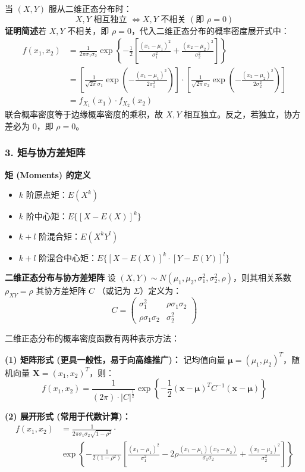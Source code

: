 当 $(X, Y)$ 服从二维正态分布时：
$$ X, Y \text{ 相互独立 } \iff X, Y \text{ 不相关 } (\text{即 } \rho = 0) $$
\textbf{证明简述}\quad 若 $X, Y$ 不相关，即 $\rho = 0$，代入二维正态分布的概率密度展开式中：
$$ 
\begin{aligned}
f(x_1, x_2) &= \frac{1}{2\pi \sigma_1 \sigma_2} \exp\left\{ -\frac{1}{2} \left[ \frac{(x_1-\mu_1)^2}{\sigma_1^2} + \frac{(x_2-\mu_2)^2}{\sigma_2^2} \right] \right\} \\
&= \left[ \frac{1}{\sqrt{2\pi}\sigma_1} \exp\left(-\frac{(x_1-\mu_1)^2}{2\sigma_1^2}\right) \right] \cdot \left[ \frac{1}{\sqrt{2\pi}\sigma_2} \exp\left(-\frac{(x_2-\mu_2)^2}{2\sigma_2^2}\right) \right] \\
&= f_{X_1}(x_1) \cdot f_{X_2}(x_2)
\end{aligned}
$$
联合概率密度等于边缘概率密度的乘积，故 $X, Y$ 相互独立。反之，若独立，协方差必为 0，即 $\rho = 0$。


\vspace{1em}
\subsubsection*{3. 矩与协方差矩阵}

\textbf{矩 (Moments) 的定义}
\begin{itemize}
    \item $k$ 阶原点矩：$E(X^k)$
    \item $k$ 阶中心矩：$E\{[X - E(X)]^k\}$
    \item $k+l$ 阶混合矩：$E(X^k Y^l)$
    \item $k+l$ 阶混合中心矩：$E\{[X - E(X)]^k \cdot [Y - E(Y)]^l\}$
\end{itemize}

\textbf{二维正态分布与协方差矩阵}
设 $(X, Y) \sim N(\mu_1, \mu_2, \sigma_1^2, \sigma_2^2, \rho)$，则其相关系数 $\rho_{XY} = \rho$
其协方差矩阵 $C$ （或记为 $\Sigma$）定义为：
$$ C = \begin{pmatrix} \sigma_1^2 & \rho \sigma_1 \sigma_2 \\ \rho \sigma_1 \sigma_2 & \sigma_2^2 \end{pmatrix} $$

二维正态分布的概率密度函数有两种表示方法：

\textbf{(1) 矩阵形式 (更具一般性，易于向高维推广)：}
记均值向量 $\boldsymbol{\mu} = (\mu_1, \mu_2)^T$，随机向量 $\boldsymbol{X} = (x_1, x_2)^T$，则：
$$ f(x_1, x_2) = \frac{1}{(2\pi) \cdot |C|^{\frac{1}{2}}} \exp\left\{ -\frac{1}{2} (\boldsymbol{x} - \boldsymbol{\mu})^T C^{-1} (\boldsymbol{x} - \boldsymbol{\mu}) \right\} $$

\textbf{(2) 展开形式 (常用于代数计算)：}
$$ 
\begin{aligned}
f(x_1, x_2) &= \frac{1}{2\pi \sigma_1 \sigma_2 \sqrt{1-\rho^2}} \cdot \\
&\exp\left\{ -\frac{1}{2(1-\rho^2)} \left[ \frac{(x_1-\mu_1)^2}{\sigma_1^2} - 2\rho \frac{(x_1-\mu_1)(x_2-\mu_2)}{\sigma_1 \sigma_2} + \frac{(x_2-\mu_2)^2}{\sigma_2^2} \right] \right\}
\end{aligned}
$$